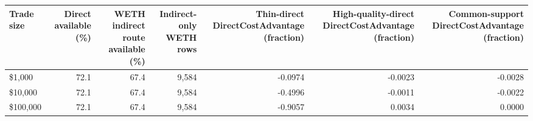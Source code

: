 \begin{tabular}{lrrrrrr}
\toprule
Trade size & Direct available (\%) & WETH indirect route available (\%) & Indirect-only WETH rows & Thin-direct DirectCostAdvantage (fraction) & High-quality-direct DirectCostAdvantage (fraction) & Common-support DirectCostAdvantage (fraction) \\
\midrule
\$1,000 & 72.1 & 67.4 & 9,584 & -0.0974 & -0.0023 & -0.0028 \\
\$10,000 & 72.1 & 67.4 & 9,584 & -0.4996 & -0.0011 & -0.0022 \\
\$100,000 & 72.1 & 67.4 & 9,584 & -0.9057 & 0.0034 & 0.0000 \\
\bottomrule
\end{tabular}
